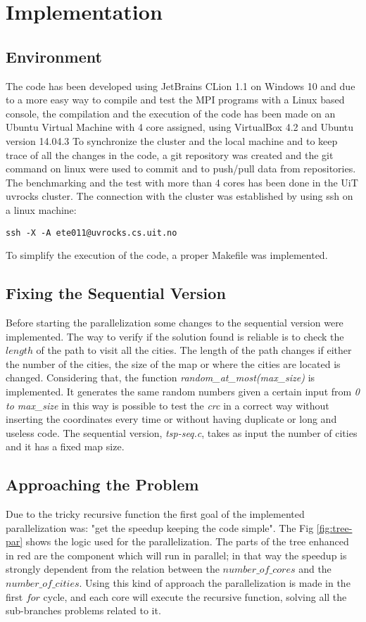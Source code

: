 \documentclass[11pt,conference]{IEEEtran}
\begin{document}
\section{Implementation}
\iffalse
\subsection{Environment}
The code has been developed using JetBrains CLion 1.1 on Windows 10 and due to a more easy way to compile and test the MPI programs with a Linux based console, the compilation and the execution of the code has been made on an Ubuntu Virtual Machine with 4 core assigned, using VirtualBox 4.2 and Ubuntu version 14.04.3
\newline
To synchronize the cluster and the local machine and to keep trace of all the changes in the code, a git repository was created and the git command on linux were used to commit and to push/pull data from repositories.
\newline
The benchmarking and the test with more than 4 cores has been done in the UiT uvrocks cluster. The connection with the cluster was established by using ssh on a linux machine:
\begin{lstlisting}
ssh -X -A ete011@uvrocks.cs.uit.no
\end{lstlisting}
To simplify the execution of the code, a proper Makefile was implemented.

\subsection{Fixing the Sequential Version}
Before starting the parallelization some changes to the sequential version were implemented. The way to verify if the solution found is reliable is to check the $length$ of the path to visit all the cities. The length of the path changes if either the number of the cities, the size of the map or where the cities are located is changed. Considering that, the function \textit{random\_at\_most(max\_size)} is implemented. It generates the same random numbers given a certain input from \textit{0 to max\_size} in this way is possible to test the \textit{crc} in a correct way without inserting the coordinates every time or without having duplicate or long and useless code.
The sequential version, \textit{tsp-seq.c}, takes as input the number of cities and it has a fixed map size.

\subsection{Approaching the Problem}
Due to the tricky recursive function the first goal of the implemented parallelization was: "get the speedup keeping the code simple". 
The Fig \ref{fig:tree-par} shows the logic used for the parallelization. The parts of the tree enhanced in red are the component which will run in parallel; in that way the speedup is strongly dependent from the relation between the $number\_of\_cores$ and the $number\_of\_cities$. Using this kind of approach the parallelization is made in the first $for$ cycle, and each core will execute the recursive function, solving all the sub-branches problems related to it.
\end{document}
